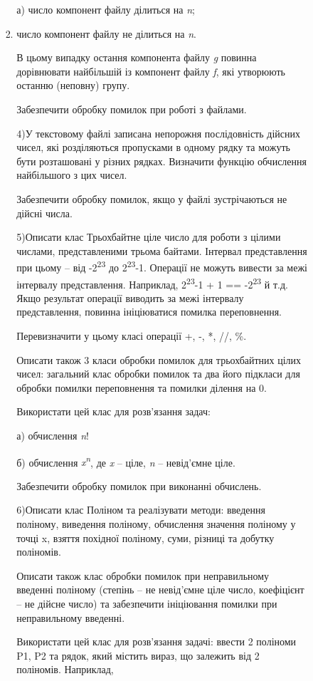 \documentclass[]{article}
\makeatletter
\newcommand{\xslalph}[1]{\expandafter\@xslalph\csname c@#1\endcsname}
\newcommand{\@xslalph}[1]{%
    \ifcase#1\or а\or б\or в\or г\or д\or e\or є\or ж\or з\or i%
    \or й\or к\or л\or м\or н\or о\or п\or р\or с\or т%
    \or у\or ф\or х\or ц\or ч\or ш\or ю\or я\or аа\or бб\or вв%
    \else\@ctrerr\fi%
}
\makeatother
\begin{document}
\begin{enumerate}
\begin{enumerate}[label=\xslalph*)]
\begin{enumerate}
\begin{enumerate}[label=\xslalph*)]
а) число компонент файлу ділиться на \emph{n};
\item число компонент файлу не ділиться на \emph{n}.

В цьому випадку остання компонента файлу \emph{g} повинна дорівнювати
найбільшій із компонент файлу \emph{f}, які утворюють останню (неповну)
групу.

Забезпечити обробку помилок при роботі з файлами.

4)У текстовому файлі записана непорожня послідовність дійсних чисел, які
розділяються пропусками в одному рядку та можуть бути розташовані у
різних рядках. Визначити функцію обчислення найбільшого з цих чисел.

Забезпечити обробку помилок, якщо у файлі зустрічаються не дійсні числа.

5)Описати клас Трьохбайтне ціле число для роботи з цілими числами,
представленими трьома байтами. Інтервал представлення при цьому -- від
-2\textsuperscript{23} до 2\textsuperscript{23}-1. Операції не можуть
вивести за межі інтервалу представлення. Наприклад,
2\textsuperscript{23}-1 + 1 == -2\textsuperscript{23} й т.д. Якщо
результат операції виводить за межі інтервалу представлення, повинна
ініціюватися помилка переповнення.

Перевизначити у цьому класі операції +, -, *, //, \%.

Описати також 3 класи обробки помилок для трьохбайтних цілих чисел:
загальний клас обробки помилок та два його підкласи для обробки помилки
переповнення та помилки ділення на 0.

Використати цей клас для розв'язання задач:

а) обчислення \emph{n}!

б) обчислення \emph{x\textsuperscript{n}}, де \emph{x} -- ціле, \emph{n}
-- невід'ємне ціле.

Забезпечити обробку помилок при виконанні обчислень.

6)Описати клас Поліном та реалізувати методи: введення поліному,
виведення поліному, обчислення значення поліному у точці x, взяття
похідної поліному, суми, різниці та добутку поліномів.

Описати також клас обробки помилок при неправильному введенні поліному
(степінь -- не невід'ємне ціле число, коефіцієнт -- не дійсне число) та
забезпечити ініціювання помилки при неправильному введенні.

Використати цей клас для розв'язання задачі: ввести 2 поліноми P1, P2 та
рядок, який містить вираз, що залежить від 2 поліномів. Наприклад,


\end{enumerate}
\end{enumerate}
\end{enumerate}
\end{enumerate}
\end{document}
